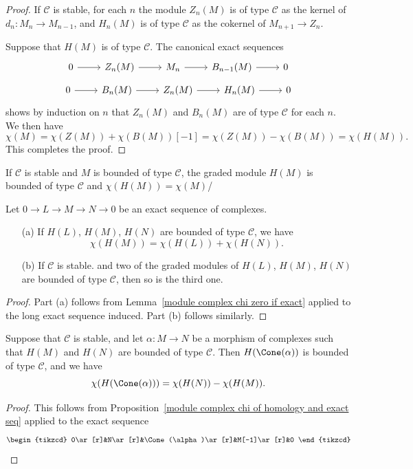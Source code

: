 \begin{proof}
If $\mathscr{C}$ is stable, for each $n$ the module $Z_n(M)$ is of type $\mathscr{C}$ as the kernel of $d_n:M_n\to M_{n-1}$, and $H_n(M)$ is of type $\mathscr{C}$ as the cokernel of $M_{n+1}\to Z_n$.\par
Suppose that $H(M)$ is of type $\mathscr{C}$. The canonical exact sequences
\[\begin{tikzcd}
0\ar[r]&Z_n(M)\ar[r]&M_n\ar[r]&B_{n-1}(M)\ar[r]&0
\end{tikzcd}\]
\[\begin{tikzcd}
0\ar[r]&B_n(M)\ar[r]&Z_n(M)\ar[r]&H_n(M)\ar[r]&0
\end{tikzcd}\]
shows by induction on $n$ that $Z_n(M)$ and $B_n(M)$ are of type $\mathscr{C}$ for each $n$. We then have
\[\chi(M)=\chi(Z(M))+\chi(B(M))[-1]=\chi(Z(M))-\chi(B(M))=\chi(H(M)).\]
This completes the proof.
\end{proof}
\begin{corollary}
If $\mathscr{C}$ is stable and $M$ is bounded of type $\mathscr{C}$, the graded module $H(M)$ is bounded of type $\mathscr{C}$ and $\chi(H(M))=\chi(M)$/
\end{corollary}
\begin{proposition}\label{module complex chi of homology and exact seq}
Let $0\to L\to M\to N\to 0$ be an exact sequence of complexes.
\begin{itemize}
\item[(a)] If $H(L)$, $H(M)$, $H(N)$ are bounded of type $\mathscr{C}$, we have
\[\chi(H(M))=\chi(H(L))+\chi(H(N)).\] 
\item[(b)] If $\mathscr{C}$ is stable. and two of the graded modules of $H(L)$, $H(M)$, $H(N)$ are bounded of type $\mathscr{C}$, then so is the third one.
\end{itemize}
\end{proposition}
\begin{proof}
Part (a) follows from Lemma~\ref{module complex chi zero if exact} applied to the long exact sequence induced. Part (b) follows similarly.  
\end{proof}
\begin{corollary}\label{module complex chi of homology of mapping cone prop}
Suppose that $\mathscr{C}$ is stable, and let $\alpha:M\to N$ be a morphism of complexes such that $H(M)$ and $H(N)$ are bounded of type $\mathscr{C}$. Then $H(\Cone(\alpha))$ is bounded of type $\mathscr{C}$, and we have
\[\chi(H(\Cone(\alpha)))=\chi(H(N))-\chi(H(M)).\]
\end{corollary}
\begin{proof}
This follows from Proposition~\ref{module complex chi of homology and exact seq} applied to the exact sequence
\begin{equation*}
\begin{tikzcd}
0\ar[r]&N\ar[r]&\Cone(\alpha)\ar[r]&M[-1]\ar[r]&0
\end{tikzcd}\qedhere
\end{equation*}
\end{proof}
